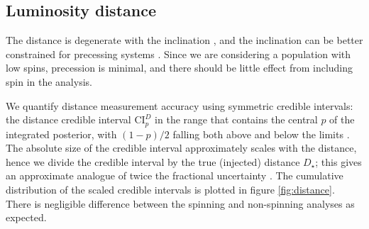 \subsection{Luminosity distance}\label{sec:distance}

The distance is degenerate with the inclination \citep{Cutler_1994,Aasi_2013}, and the inclination can be better constrained for precessing systems \citep{van_der_Sluys_2008,Vitale_2014}. Since we are considering a population with low spins, precession is minimal, and there should be little effect from including spin in the analysis.

We quantify distance measurement accuracy using symmetric credible intervals: the distance credible interval $\mathrm{CI}_p^{D}$ in the range that contains the central $p$ of the integrated posterior, with $(1-p)/2$ falling both above and below the limits \citep{Aasi_2013}. The absolute size of the credible interval approximately scales with the distance, hence we divide the credible interval by the true (injected) distance $D_\star$; this gives an approximate analogue of twice the fractional uncertainty \citep{Berry_2014}. The cumulative distribution of the scaled credible intervals is plotted in figure \ref{fig:distance}. There is negligible difference between the spinning and non-spinning analyses as expected.


  